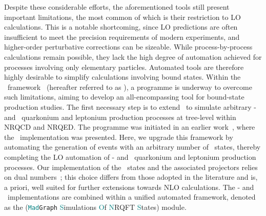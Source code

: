 Despite these considerable efforts, the aforementioned tools still present important limitations, the most common of which is their restriction to LO calculations. This is a notable shortcoming, since LO predictions are often insufficient to meet the precision requirements of modern experiments, and higher-order perturbative corrections can be sizeable. While process-by-process calculations remain possible, they lack the high degree of automation achieved for processes involving only elementary particles. Automated tools are therefore highly desirable to simplify calculations involving bound states.
Within the \madgraph\ framework~\cite{Alwall:2014hca,Frederix:2018nkq} (hereafter referred to as \mgshort), a programme is underway to overcome such limitations, aiming to develop an all-encompassing tool for bound-state production studies. The first necessary step is to extend \mgshort\ to simulate arbitrary \swave- and \pwavetxt\ quarkonium and leptonium production processes at tree-level within NRQCD and NRQED.
The programme was initiated in an earlier work~\cite{ColpaniSerri:2025vdz}, where the \swavetxt\ implementation was presented. 
Here, we upgrade this framework by automating the generation of events with an arbitrary number of \pwavetxt\ states, thereby completing the LO automation of \swave- and \pwavetxt\ quarkonium and leptonium production processes.
Our implementation of the \pwavetxt\ states and the associated projectors relies on dual numbers~\cite{Clifford:1871aaa}; this choice differs from those adopted in the literature and is, a priori, well suited for further extensions towards NLO calculations.
The \swave- and \pwavetxt\ implementations are combined within a unified automated framework, denoted as the \textcolor{teal}{\madsons} (\texttt{\textcolor{teal}{Mad}Graph} \textcolor{teal}{S}imulations \textcolor{teal}{O}f \textcolor{teal}{N}RQFT \textcolor{teal}{S}tates) module.

